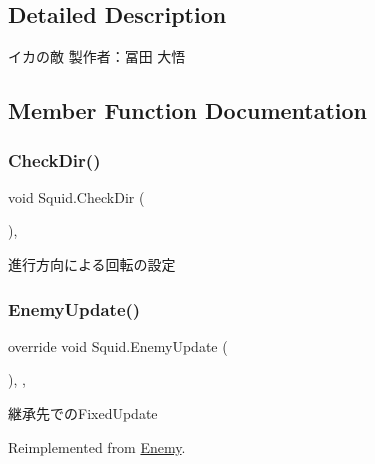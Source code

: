 \subsection{Detailed Description}
イカの敵 製作者：冨田 大悟 



\subsection{Member Function Documentation}
\mbox{\label{class_squid_a90e09dd2b8978f5a6f749078f2913ebe}} 
\subsubsection{\texorpdfstring{Check\+Dir()}{CheckDir()}}
{\footnotesize\ttfamily void Squid.\+Check\+Dir (\begin{DoxyParamCaption}{ }\end{DoxyParamCaption})\hspace{0.3cm}{\ttfamily [inline]}, {\ttfamily [private]}}



進行方向による回転の設定 

\mbox{\label{class_squid_ab737cee06933e0631c45bb7fef86fe6b}} 
\subsubsection{\texorpdfstring{Enemy\+Update()}{EnemyUpdate()}}
{\footnotesize\ttfamily override void Squid.\+Enemy\+Update (\begin{DoxyParamCaption}{ }\end{DoxyParamCaption})\hspace{0.3cm}{\ttfamily [inline]}, {\ttfamily [protected]}, {\ttfamily [virtual]}}



継承先での\+Fixed\+Update 



Reimplemented from \hyperlink{class_enemy_ab19a73003a5b443ba93f4b6a45c0abad}{Enemy}.

\mbox{\label{class_squid_a7350ce67466554aa0c46c9da7c5e6da2}} 
